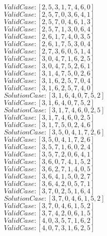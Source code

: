 \documentclass{article}
\begin{document}
	$Valid Case   : [2, 5, 3, 1, 7, 4, 6, 0]$\\
	$Valid Case   : [2, 5, 7, 0, 3, 6, 4, 1]$\\
	$Valid Case   : [2, 5, 7, 0, 4, 6, 1, 3]$\\
	$Valid Case   : [2, 5, 7, 1, 3, 0, 6, 4]$\\
	$Valid Case   : [2, 6, 1, 7, 4, 0, 3, 5]$\\
	$Valid Case   : [2, 6, 1, 7, 5, 3, 0, 4]$\\
	$Valid Case   : [2, 7, 3, 6, 0, 5, 1, 4]$\\
	$Valid Case   : [3, 0, 4, 7, 1, 6, 2, 5]$\\
	$Valid Case   : [3, 0, 4, 7, 5, 2, 6, 1]$\\
	$Valid Case   : [3, 1, 4, 7, 5, 0, 2, 6]$\\
	$Valid Case   : [3, 1, 6, 2, 5, 7, 0, 4]$\\
	$Valid Case   : [3, 1, 6, 2, 5, 7, 4, 0]$\\
	$Solution Case: [3, 1, 6, 4, 0, 7, 5, 2]$\\
	$Valid Case   : [3, 1, 6, 4, 0, 7, 5, 2]$\\
	$Solution Case: [3, 1, 7, 4, 6, 0, 2, 5]$\\
	$Valid Case   : [3, 1, 7, 4, 6, 0, 2, 5]$\\
	$Valid Case   : [3, 1, 7, 5, 0, 2, 4, 6]$\\
	$Solution Case: [3, 5, 0, 4, 1, 7, 2, 6]$\\
	$Valid Case   : [3, 5, 0, 4, 1, 7, 2, 6]$\\
	$Valid Case   : [3, 5, 7, 1, 6, 0, 2, 4]$\\
	$Valid Case   : [3, 5, 7, 2, 0, 6, 4, 1]$\\
	$Valid Case   : [3, 6, 0, 7, 4, 1, 5, 2]$\\
	$Valid Case   : [3, 6, 2, 7, 1, 4, 0, 5]$\\
	$Valid Case   : [3, 6, 4, 1, 5, 0, 2, 7]$\\
	$Valid Case   : [3, 6, 4, 2, 0, 5, 7, 1]$\\
	$Valid Case   : [3, 7, 0, 2, 5, 1, 6, 4]$\\
	$Solution Case: [3, 7, 0, 4, 6, 1, 5, 2]$\\
	$Valid Case   : [3, 7, 0, 4, 6, 1, 5, 2]$\\
	$Valid Case   : [3, 7, 4, 2, 0, 6, 1, 5]$\\
	$Valid Case   : [4, 0, 3, 5, 7, 1, 6, 2]$\\
	$Valid Case   : [4, 0, 7, 3, 1, 6, 2, 5]$\\
\end{document}

